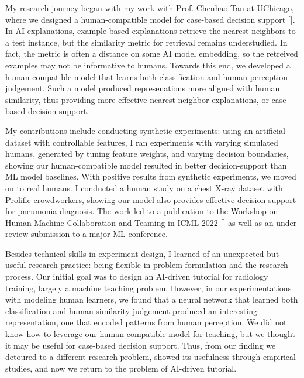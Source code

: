 


My research journey began with my work with Prof. Chenhao Tan at UChicago, where we designed a human-compatible model for case-based decision support []. 
In AI explanations, example-based explanations retrieve the nearest neighbors to a test instance, but the similarity metric for retrieval remains understudied. In fact, the metric is often a distance on some AI model embedding, so the retreived examples may not be informative to humans. 
Towards this end, we developed a human-compatible model that learns both classification and human perception judgement. 
Such a model produced represenations more aligned with human similarity, thus providing more effective nearest-neighbor explanations, or case-based decision-support. 

My contributions include conducting synthetic experiments: using an artificial dataset with controllable features, I ran experiments with varying simulated humans, generated by tuning feature weights, and varying decision boundaries, showing our human-compatible model resulted in better decision-support than ML model baselines. 
With positive results from synthetic experiments, we moved on to real humans. I conducted a human study on a chest X-ray dataset with Prolific crowdworkers, showing our model also provides effective decision support for pneumonia diagnosis. 
The work led to a publication to the Workshop on Human-Machine Collaboration and Teaming in ICML 2022 [] as well as an under-review submission to a major ML conference.

Besides technical skills in experiment design, I learned of an unexpected but useful research practice: being flexible in problem formulation and the research process. 
Our initial goal was to design an AI-driven tutorial for radiology training, largely a machine teaching problem. 
However, in our experimentations with modeling human learners, we found that a neural network that learned both classification and human similarity judgement produced an interesting representation, one that encoded patterns from human perception. 
We did not know how to leverage our human-compatible model for teaching, but we thought it may be useful for case-based decision support. 
Thus, from our finding we detoured to a different research problem, showed its usefulness through empirical studies, and now we return to the problem of AI-driven tutorial.



